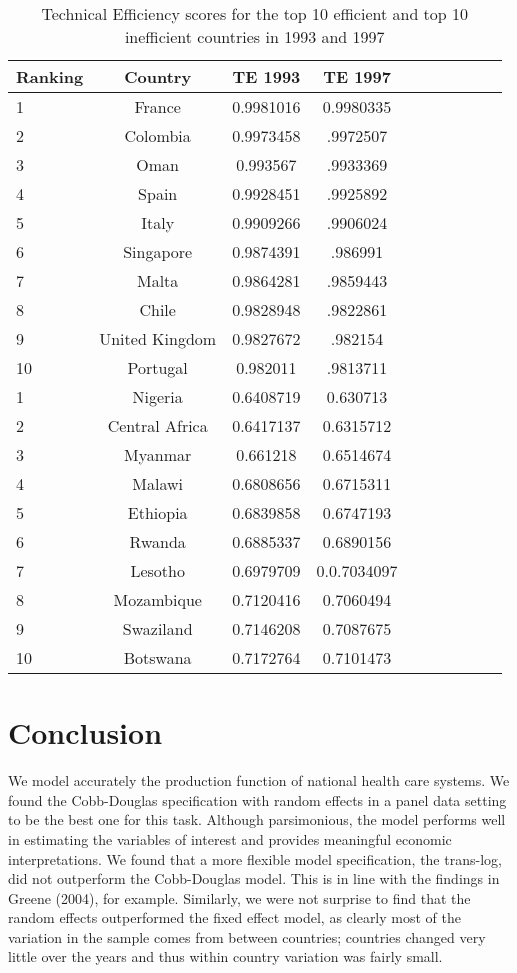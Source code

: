 \documentclass[12pt,a4paper]{article}\usepackage[]{graphicx}\usepackage[]{color}
\begin{document}
 \begin{table}[H]
\centering

\caption{Technical Efficiency scores for the top 10 efficient and top 10 inefficient countries in 1993 and 1997 }
\begin{tabular}{lccccccccc}
  \label{tab:93-7}
Ranking &  Country & TE 1993 & TE 1997\\ 
 
  \hline \hline
   1 & France & 0.9981016 & 0.9980335\\ 
   2 & Colombia & 0.9973458 & .9972507\\ 
   3 & Oman &  0.993567 & .9933369\\ 
   4 & Spain &   0.9928451  & .9925892 \\ 
   5 & Italy &  0.9909266  & .9906024\\ 
   6 & Singapore & 0.9874391 & .986991\\
   7 & Malta & 0.9864281  & .9859443\\
   8 & Chile  & 0.9828948 & .9822861\\
   9 & United Kingdom & 0.9827672 & .982154\\
   10 & Portugal & 0.982011 & .9813711\\
  \hline
   1 & Nigeria& 0.6408719 & 0.630713\\ 
   2 & Central Africa & 0.6417137 & 0.6315712\\ 
   3 & Myanmar &  0.661218 & 0.6514674\\ 
   4 & Malawi &   0.6808656  & 0.6715311\\ 
   5 & Ethiopia &  0.6839858 & 0.6747193\\ 
   6 & Rwanda & 0.6885337 & 0.6890156\\
   7 & Lesotho & 0.6979709 & 0.0.7034097\\
   8 & Mozambique  & 0.7120416 & 0.7060494\\
   9 & Swaziland & 0.7146208 & 0.7087675\\
   10 & Botswana & 0.7172764 & 0.7101473
 \\
   \hline \hline
\end{tabular}

\end{table}

\section{Conclusion}
We model accurately the production function of national health care systems. We found the Cobb-Douglas specification with random effects in a panel data setting to be the best one for this task. Although parsimonious, the model performs well in estimating the variables of interest and provides meaningful economic interpretations.  We found that a more flexible model specification, the trans-log, did not outperform the Cobb-Douglas model. This is in line with the findings in Greene (2004), for example. Similarly, we were not surprise to find that the random effects outperformed the fixed effect model, as clearly most of the variation in the sample comes from between countries; countries changed very little over the years and thus within country variation was fairly small. 
\end{document}
